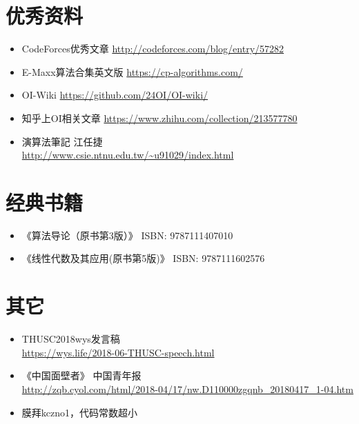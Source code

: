 \section{优秀资料}
\begin{itemize}
    \item CodeForces优秀文章 \url{http://codeforces.com/blog/entry/57282}
    \item E-Maxx算法合集英文版 \url{https://cp-algorithms.com/}
    \item OI-Wiki \url{https://github.com/24OI/OI-wiki/}
    \item 知乎上OI相关文章 \url{https://www.zhihu.com/collection/213577780}
    \item 演算法筆記 江任捷\\\url{http://www.csie.ntnu.edu.tw/\~u91029/index.html}
\end{itemize}
\section{经典书籍}
\begin{itemize}
    \item 《算法导论（原书第3版）》 ISBN: 9787111407010
    \item 《线性代数及其应用(原书第5版)》 ISBN: 9787111602576
\end{itemize}
\section{其它}
\begin{itemize}
    \item THUSC2018wys发言稿 \\\url{https://wys.life/2018-06-THUSC-speech.html}
    \item 《中国面壁者》 中国青年报\\
    {\footnotesize \url{http://zqb.cyol.com/html/2018-04/17/nw.D110000zgqnb\_20180417\_1-04.htm}}
    \item 膜拜kczno1，代码常数超小
\end{itemize}
